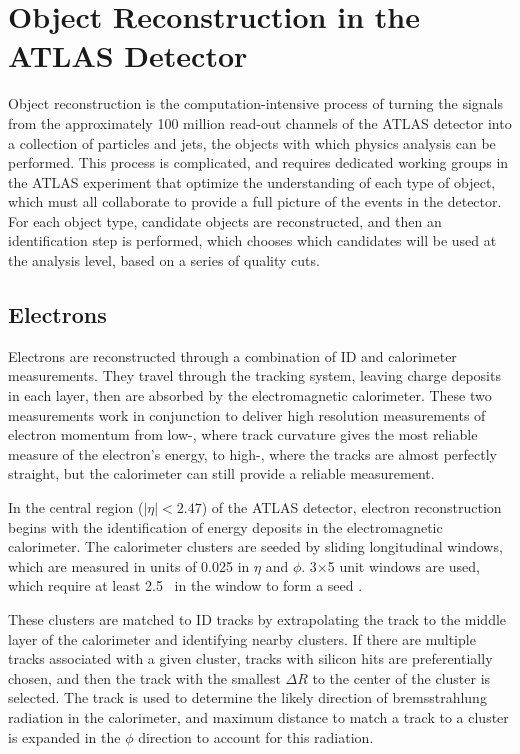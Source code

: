 \chapter{Object Reconstruction in the ATLAS Detector} %
\label{ch:reconstruction} 

Object reconstruction is the computation-intensive process of turning the signals from the approximately 100 million read-out channels of the ATLAS detector into a collection of particles and jets, the objects with which physics analysis can be performed. This process is complicated, and requires dedicated working groups in the ATLAS experiment that optimize the understanding of each type of object, which must all collaborate to provide a full picture of the events in the detector. For each object type, candidate objects are reconstructed, and then an identification step is performed, which chooses which candidates will be used at the analysis level, based on a series of quality cuts.


\section{Electrons}
\label{sec:reco_electrons}

Electrons are reconstructed through a combination of \ac{ID} and calorimeter measurements. They travel through the tracking system, leaving charge deposits in each layer, then are absorbed by the electromagnetic calorimeter. These two measurements work in conjunction to deliver high resolution measurements of electron momentum from low-\pt, where track curvature gives the most reliable measure of the electron's energy, to high-\pt, where the tracks are almost perfectly straight, but the calorimeter can still provide a reliable measurement. 

In the central region ($|\eta|<2.47$) of the ATLAS detector, electron reconstruction begins with the identification of energy deposits in the electromagnetic calorimeter. The calorimeter clusters are seeded by sliding longitudinal windows, which are measured in units of 0.025 in $\eta$ and $\phi$. 3$\times$5 unit windows are used, which require at least 2.5 \gev~in the window to form a seed \cite{Aad:2011mk}. 

These clusters are matched to \ac{ID} tracks by extrapolating the track to the middle layer of the calorimeter and identifying nearby clusters. If there are multiple tracks associated with a given cluster, tracks with silicon hits are preferentially chosen, and then the track with the smallest $\Delta R$ to the center of the cluster is selected. The track is used to determine the likely direction of bremsstrahlung radiation in the calorimeter, and maximum distance to match a track to a cluster is expanded in the $\phi$ direction to account for this radiation.

